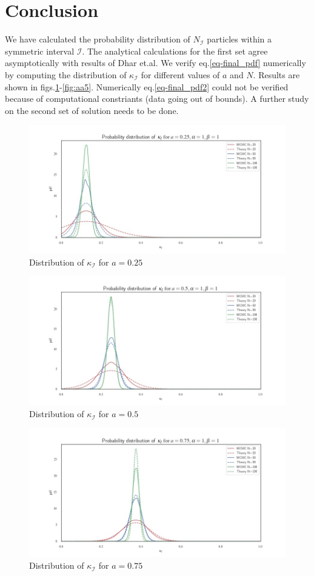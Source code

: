 \documentclass[11pt]{article}
\begin{document}
\section{Conclusion}
We have calculated the probability distribution of $N_\mathcal{I}$ particles within a symmetric interval $\mathcal{I}$. The analytical calculations for the first set agree asymptotically with results of Dhar et.al\cite{ref:dhar}. We verify eq.\eqref{eq-final_pdf} numerically by computing the distribution of $\kappa_\mathcal{I}$ for different values of $a$ and $N$. Results are shown in figs.\ref{fig:aa1}-\ref{fig:aa5}. Numerically eq.\eqref{eq-final_pdf2} could not be verified because of computational constriants (data going out of bounds). A further study on the second set of solution needs to be done.
\begin{figure}[H]
	\centering
	\includegraphics[width=0.8\columnwidth]{aa1.jpg}
	\caption{Distribution of $\kappa_\mathcal{I}$ for $a=0.25$}
	\label{fig:aa1}
\end{figure}
\begin{figure}[H]
	\centering
	\includegraphics[width=0.8\columnwidth]{aa2.jpg}
	\caption{Distribution of $\kappa_\mathcal{I}$ for $a=0.5$}
	\label{fig:aa2}
\end{figure}
\begin{figure}[H]
	\centering
	\includegraphics[width=0.8\columnwidth]{aa3.jpg}
	\caption{Distribution of $\kappa_\mathcal{I}$ for $a=0.75$}
	\label{fig:aa3}
\end{figure}
\end{document}
